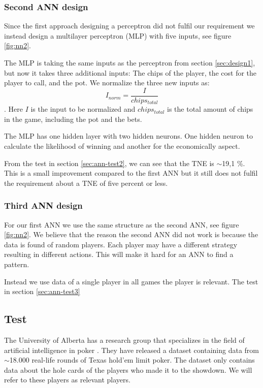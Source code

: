 \subsubsection{Second ANN design}
\label{sec:design2}
Since the first approach designing a perceptron did not fulfil our requirement we instead design a multilayer perceptron (MLP) with five inputs, see figure \ref{fig:nn2}.

The MLP is taking the same inputs as the perceptron from section \ref{sec:design1}, but now it takes three additional inputs: The chips of the player, the cost for the player to call, and the pot. We normalize the three new inputs as: \[I_{norm} = \frac{I}{chips_{total}}\]. 
Here $I$ is the input to be normalized and $chips_{total}$ is the total amount of chips in the game, including the pot and the bets.

The MLP has one hidden layer with two hidden neurons. One hidden neuron to calculate the likelihood of winning and another for the economically aspect.



From the test in section \ref{sec:ann-test2}, we can see that the TNE is $\sim$19,1 \%. This is a small improvement compared to the first ANN but it still does not fulfil the requirement about a TNE of five percent or less.

\subsubsection{Third ANN design}
\label{sec:design3}
For our first ANN we use the same structure as the second ANN, see figure \ref{fig:nn2}. We believe that the reason the second ANN did not work is because the data is found of random players. Each player may have a different strategy resulting in different actions. This will make it hard for an ANN to find a pattern. 

Instead we use data of a single player in all games the player is relevant. The test in section \ref{sec:ann-test3}

\subsection{Test}
\label{sec:default-test}

The University of Alberta has a research group that specializes in the field of artificial intelligence in poker \cite{alberta}. They have released a dataset containing data from $\sim$18.000 real-life rounds of Texas hold'em limit poker. The dataset only contains data about the hole cards of the players who made it to the showdown. We will refer to these players as relevant players.

